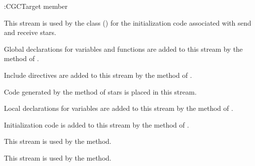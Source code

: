 \begin{indexlist}{:CGCTarget member}

This stream is used by the   class () for the initialization code
associated with send and receive stars.

 Global declarations for variables
and functions are added to this stream by the 
 method of .

 Include directives are added to this
stream by the   method of
.

Code generated by the   method of
stars is placed in this stream.

Local declarations for variables are added to this stream by the
  method of
.

Initialization code is added to this stream by the 
 method of .

This stream is used by the  method.

This stream is used by the  method.

\end{indexlist}


